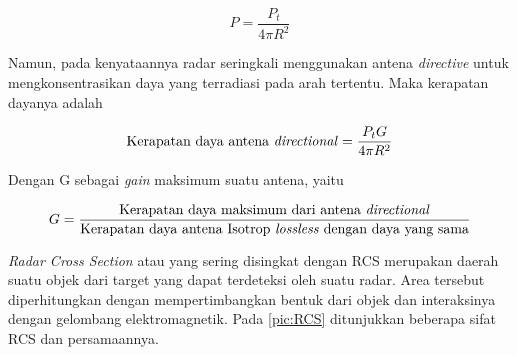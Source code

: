 \begin{equation}
	P = \frac{P_{t}}{4\pi R^{2}}
\end{equation}

Namun, pada kenyataannya radar seringkali menggunakan antena \textit{directive} untuk mengkonsentrasikan daya yang terradiasi pada arah tertentu. Maka kerapatan dayanya adalah

\begin{equation}
	\text{Kerapatan daya antena \textit{directional}} = \frac{P_{t} G}{4\pi R^{2}}
\end{equation}

Dengan G sebagai \textit{gain} maksimum suatu antena, yaitu

\begin{equation}
	G  = \frac{\text{Kerapatan daya maksimum dari antena \textit{directional}}}{\text{Kerapatan daya antena Isotrop \textit{lossless} dengan daya yang sama}}
\end{equation}

\textit{Radar Cross Section} atau yang sering disingkat dengan RCS merupakan daerah suatu objek dari target yang dapat terdeteksi oleh suatu radar. Area tersebut diperhitungkan dengan mempertimbangkan bentuk dari objek dan interaksinya dengan gelombang elektromagnetik. Pada \ref{pic:RCS} ditunjukkan beberapa sifat RCS dan persamaannya.

